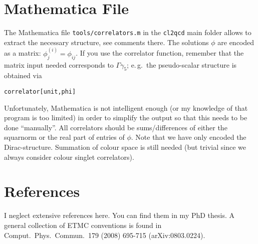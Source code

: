 \documentclass[a4paper]{article}
\begin{document}
\section{Mathematica File}
The Mathematica file \verb+tools/correlators.m+ in the \verb+cl2qcd+ main folder allows to extract the necessary structure, see comments there. The solutions $\phi$ are encoded as a matrix: $\phi^{(i)}_j = \phi_{ij}$. If you use the correlator function, remember that the matrix input needed corresponds to $\Gamma\gamma_5$; e.\,g.\ the pseudo-scalar structure is obtained via
\begin{verbatim}
correlator[unit,phi]
\end{verbatim}
Unfortunately, Mathematica is not intelligent enough (or my knowledge of that program is too limited) in order to simplify the output so that this needs to be done ``manually''. All correlators should be sums/differences of either the squarnorm or the real part of entries of $\phi$. Note that we have only encoded the Dirac-structure. Summation of colour space is still needed (but trivial since we always consider colour singlet correlators).


\section{References}
I neglect extensive references here. You can find them in my PhD thesis. A general collection of ETMC conventions is found in Comput.\ Phys.\ Commun.\ 179 (2008) 695-715 (arXiv:0803.0224).
\end{document}
